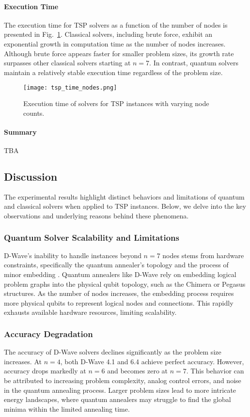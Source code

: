 \documentclass[conference]{IEEEtran}
\begin{document}
\paragraph{Execution Time} 
The execution time for TSP solvers as a function of the number of nodes is presented in Fig.~\ref{fig_tsp_time}. 
Classical solvers, including brute force, exhibit an exponential growth in computation time as the number of nodes increases. 
Although brute force appears faster for smaller problem sizes, its growth rate surpasses other classical solvers starting at \(n=7\). 
In contrast, quantum solvers maintain a relatively stable execution time regardless of the problem size. 


\begin{figure}[htbp]
\centerline{\texttt{[image: tsp\_time\_nodes.png]}}
\caption{Execution time of solvers for TSP instances with varying node counts.}
\label{fig_tsp_time}
\end{figure}

\paragraph{Summary}
TBA

\subsection{Discussion}

The experimental results highlight distinct behaviors and limitations of quantum and classical solvers when applied to TSP instances. 
Below, we delve into the key observations and underlying reasons behind these phenomena.
\subsubsection{Quantum Solver Scalability and Limitations}
D-Wave's inability to handle instances beyond \(n = 7\) nodes stems from hardware constraints, specifically the quantum annealer's topology and the process of minor embedding \cite{Lidar2021}. Quantum annealers like D-Wave rely on embedding logical problem graphs into the physical qubit topology, such as the Chimera or Pegasus structures. As the number of nodes increases, the embedding process requires more physical qubits to represent logical nodes and connections. This rapidly exhausts available hardware resources, limiting scalability.

\subsubsection{Accuracy Degradation}
The accuracy of D-Wave solvers declines significantly as the problem size increases. At \(n=4\), both D-Wave 4.1 and 6.4 achieve perfect accuracy. 
However, accuracy drops markedly at \(n=6\) and becomes zero at \(n=7\). This behavior can be attributed to increasing problem complexity, analog control errors, and noise in the quantum annealing process. 
Larger problem sizes lead to more intricate energy landscapes, where quantum annealers may struggle to find the global minima within the limited annealing time.
\end{document}
